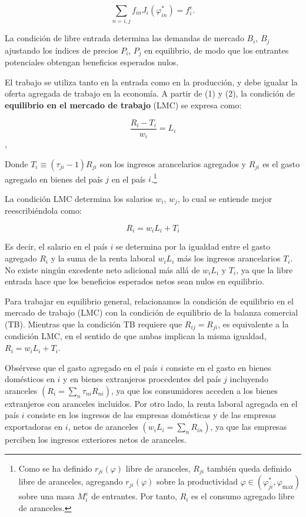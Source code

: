 \documentclass[10pt,a4paper]{article}
\begin{document}
$$\sum_{n=i,j} f_{in} J_i(\varphi_{in}^*) = f_i^e. \tag{2}$$

La condición de libre entrada determina las demandas de mercado $B_i$, $B_j$ ajustando los índices de precios $P_i$, $P_j$ en equilibrio, de modo que los entrantes potenciales obtengan beneficios esperados nulos.

El trabajo se utiliza tanto en la entrada como en la producción, y debe igualar la oferta agregada de trabajo en la economía. A partir de (1) y (2), la condición de \textbf{equilibrio en el mercado de trabajo} (LMC) se expresa como:

$$\frac{R_i - T_i}{w_i} = L_i$$,

Donde $T_i \equiv (\tau_{ji} - 1) R_{ji}$ son los ingresos arancelarios agregados y $R_{ji}$ es el gasto agregado en bienes del país $j$ en el país $i$.\footnote{%
    Como se ha definido $r_{ji}(\varphi)$ libre de aranceles, $R_{ji}$ también queda definido libre de aranceles, agregando $r_{ji}(\varphi)$ sobre la productividad $\varphi\in(\varphi_{ji}^*,\varphi_{\max})$ sobre una masa $M_i^e$ de entrantes. Por tanto, $R_i$ es el consumo agregado libre de aranceles.
}

La condición LMC determina los salarios $w_i$, $w_j$, lo cual se entiende mejor reescribiéndola como:

$$R_i = w_i L_i + T_i$$

Es decir, el salario en el país $i$ se determina por la igualdad entre el gasto agregado $R_i$ y la suma de la renta laboral $w_i L_i$ más los ingresos arancelarios $T_i$. No existe ningún excedente neto adicional más allá de $w_i L_i$ y $T_i$, ya que la libre entrada hace que los beneficios esperados netos sean nulos en equilibrio.

Para trabajar en equilibrio general, relacionamos la condición de equilibrio en el mercado de trabajo (LMC) con la condición de equilibrio de la balanza comercial (TB). Mientras que la condición TB requiere que $R_{ij} = R_{ji}$, es equivalente a la condición LMC, en el sentido de que ambas implican la misma igualdad, $R_i = w_i L_i + T_i$. 

Obsérvese que el gasto agregado en el país $i$ consiste en el gasto en bienes domésticos en $i$ y en bienes extranjeros procedentes del país $j$ incluyendo aranceles $\left(R_i = \sum_n \tau_{ni} R_{ni}\right)$, ya que los consumidores acceden a los bienes extranjeros con aranceles incluidos. Por otro lado, la renta laboral agregada en el país $i$ consiste en los ingresos de las empresas domésticas y de las empresas exportadoras en $i$, netos de aranceles $\left(w_i L_i = \sum_n R_{in}\right)$, ya que las empresas perciben los ingresos exteriores netos de aranceles.
\end{document}
